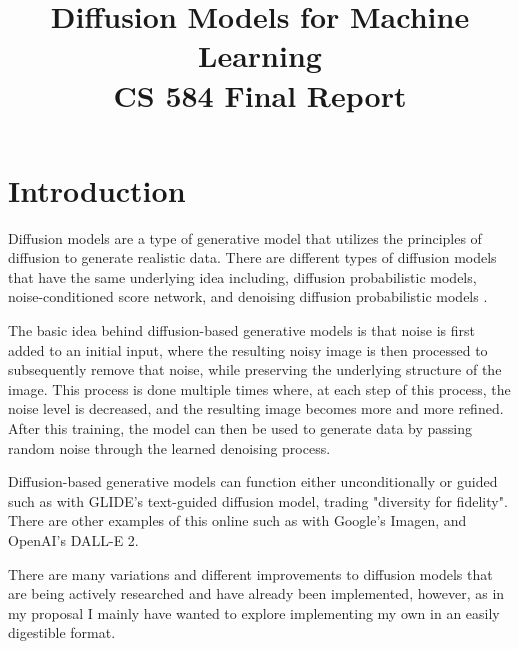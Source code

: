 \documentclass[conference]{IEEEtran}
\begin{document}
\title{%
    Diffusion Models for Machine Learning \\
    \huge CS 584 Final Report}

\author{
}

\maketitle

\section{Introduction}

\fontsize{14}{14}\selectfont

Diffusion models are a type of generative model that utilizes the principles of
diffusion to generate realistic data. There are different types of diffusion
models that have the same underlying idea including, diffusion probabilistic
models, noise-conditioned score network, and denoising diffusion probabilistic
models \cite{weng2021diffusion}.

The basic idea behind diffusion-based generative models is that noise is first
added to an initial input, where the resulting noisy image is then processed to
subsequently remove that noise, while preserving the underlying structure of
the image. This process is done multiple times where, at each step of this
process, the noise level is decreased, and the resulting image becomes more and
more refined. After this training, the model can then be used to generate data
by passing random noise through the learned denoising process.

Diffusion-based generative models can function either unconditionally or guided
such as with GLIDE's text-guided diffusion model, trading "diversity for
fidelity"\cite{GLIDE}. There are other examples of this online such as with
Google's Imagen, and OpenAI's DALL-E 2.

There are many
variations\cite{hoCF}\cite{kerasDDPM}\cite{pmlr-v162-nichol22a}\cite{hugimpl}
and different improvements\cite{nichol2021improved}\cite{song2022denoising} to
diffusion models that are being actively researched and have already been
implemented, however, as in my proposal I mainly have wanted to explore
implementing my own in an easily digestible format.
\end{document}
